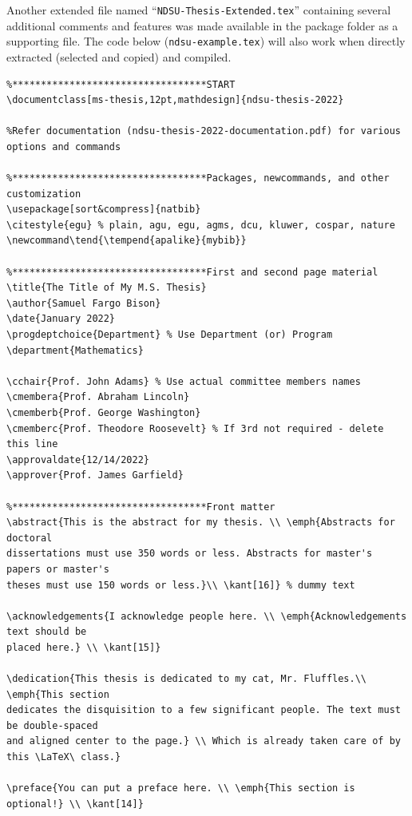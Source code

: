 \documentclass{article}
\begin{document}
Another extended file named ``\texttt{NDSU-Thesis-Extended.tex}'' containing several additional comments and features was made available in the package folder as a supporting file. The code below (\texttt{ndsu-example.tex}) will also work when directly extracted (selected and copied) and compiled.

\begin{verbatim}
%**********************************START
\documentclass[ms-thesis,12pt,mathdesign]{ndsu-thesis-2022}

%Refer documentation (ndsu-thesis-2022-documentation.pdf) for various options and commands

%**********************************Packages, newcommands, and other customization
\usepackage[sort&compress]{natbib}
\citestyle{egu} % plain, agu, egu, agms, dcu, kluwer, cospar, nature
\newcommand\tend{\tempend{apalike}{mybib}}

%**********************************First and second page material
\title{The Title of My M.S. Thesis}
\author{Samuel Fargo Bison}
\date{January 2022}
\progdeptchoice{Department} % Use Department (or) Program
\department{Mathematics}

\cchair{Prof. John Adams} % Use actual committee members names 
\cmembera{Prof. Abraham Lincoln}
\cmemberb{Prof. George Washington}
\cmemberc{Prof. Theodore Roosevelt} % If 3rd not required - delete this line 
\approvaldate{12/14/2022}
\approver{Prof. James Garfield}

%**********************************Front matter
\abstract{This is the abstract for my thesis. \\ \emph{Abstracts for doctoral
dissertations must use 350 words or less. Abstracts for master's papers or master's
theses must use 150 words or less.}\\ \kant[16]} % dummy text

\acknowledgements{I acknowledge people here. \\ \emph{Acknowledgements text should be
placed here.} \\ \kant[15]}

\dedication{This thesis is dedicated to my cat, Mr. Fluffles.\\ \emph{This section
dedicates the disquisition to a few significant people. The text must be double-spaced
and aligned center to the page.} \\ Which is already taken care of by this \LaTeX\ class.}

\preface{You can put a preface here. \\ \emph{This section is optional!} \\ \kant[14]}


\end{verbatim}
\end{document}
